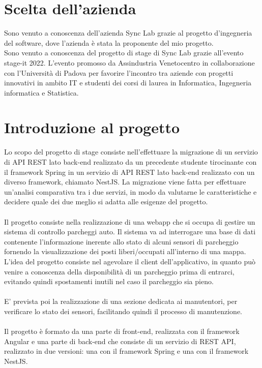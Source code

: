 \section{Scelta dell'azienda}

Sono venuto a conoscenza dell'azienda Sync Lab grazie al progetto d'ingegneria del
software, dove l'azienda è stata la proponente del mio progetto.\\
Sono venuto a conoscenza del progetto di stage di Sync Lab grazie all'evento stage-it 2022. 
L’evento promosso da Assindustria Venetocentro in collaborazione con l’Università 
di Padova per favorire l’incontro tra aziende con progetti innovativi in ambito IT e 
studenti dei corsi di laurea in Informatica, Ingegneria informatica e Statistica.\\


\section{Introduzione al progetto}

Lo scopo del progetto di stage consiste nell'effettuare la migrazione di un servizio di
API REST lato back-end realizzato da un precedente studente tirocinante con il framework
Spring in un servizio di API REST lato back-end realizzato con un diverso framework, chiamato
NestJS. La migrazione viene fatta per effettuare un'analisi comparativa tra i due servizi, in
modo da valutarne le caratteristiche e decidere quale dei due meglio si adatta alle esigenze
del progetto.
\\\\
Il progetto consiste nella realizzazione di una webapp che si occupa di gestire un sistema
di controllo parcheggi auto. Il sistema va ad interrogare una base di dati contenente
l'informazione inerente allo stato di alcuni sensori di parcheggio fornendo la visualizzazione
dei posti liberi/occupati all'interno di una mappa.
\\
L'idea del progetto consiste nel agevolare il client dell'applicativo, in quanto può venire a 
conoscenza della disponibilità di un parcheggio prima di entrarci, evitando quindi
spostamenti inutili nel caso il parcheggio sia pieno.
\\\\
E' prevista poi la realizzazione di una sezione dedicata ai manutentori, per verificare lo 
stato dei sensori, facilitando quindi il processo di manutenzione.
\\\\
Il progetto è formato da una parte di front-end, realizzata con il framework Angular e una 
parte di back-end che consiste di un servizio di REST API, realizzato in due versioni: una 
con il framework Spring e una con il framework NestJS.

